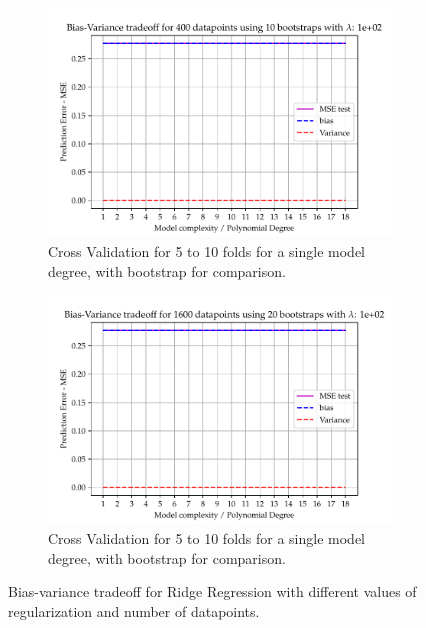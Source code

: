 \documentclass[11pt, a4paper]{article}
\begin{document}
\begin{figure}
\begin{subfigure}{0.49\textwidth}
      \includegraphics[width=\textwidth]{figures/EX5_lasso_complexity_using_bootstrap_function_lmb2099.pdf}
      \caption{\label{fig:boot_lasso_5}Cross Validation for 5 to 10 folds for a single model degree, with bootstrap for comparison.}
  \end{subfigure}
  \hfill
  \begin{subfigure}{0.49\textwidth}
      \centering
      \includegraphics[width=\textwidth]{figures/EX5_lasso_complexity_using_bootstrap_function_lmb4099.pdf}
      \caption{\label{fig:boot_lasso_6}Cross Validation for 5 to 10 folds for a single model degree, with bootstrap for comparison.}
  \end{subfigure}
  \caption{\label{sfig:boot_lasso_1}Bias-variance tradeoff for Ridge Regression with different values of regularization and number of datapoints.}
\end{figure}
\end{document}
